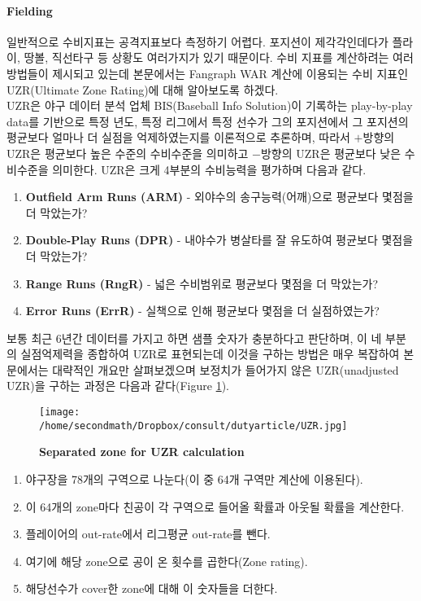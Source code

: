 \documentclass[11pt]{article}
\begin{document}
\paragraph{Fielding}
일반적으로 수비지표는 공격지표보다 측정하기 어렵다. 포지션이 제각각인데다가 플라이, 땅볼, 직선타구 등 상황도 여러가지가 있기 때문이다. 수비 지표를 계산하려는 여러 방법들이 제시되고 있는데 본문에서는 Fangraph WAR 계산에 이용되는 수비 지표인 UZR(Ultimate Zone Rating)에 대해 알아보도록 하겠다\cite{lichtman2003ultimate,piette2012estimating}.\\
UZR은 야구 데이터 분석 업체 BIS(Baseball Info Solution)이 기록하는 play-by-play data를 기반으로 특정 년도, 특정 리그에서 특정 선수가 그의 포지션에서 그 포지션의 평균보다 얼마나 더 실점을 억제하였는지를 이론적으로 추론하며, 따라서 $+$방향의 UZR은 평균보다 높은 수준의 수비수준을 의미하고 $-$방향의 UZR은 평균보다 낮은 수비수준을 의미한다. UZR은 크게 4부분의 수비능력을 평가하며 다음과 같다.
\begin{enumerate}
  \item \textbf{Outfield Arm Runs (ARM)} - 외야수의 송구능력(어깨)으로 평균보다 몇점을 더 막았는가?
  \item \textbf{Double-Play Runs (DPR)} - 내야수가 병살타를 잘 유도하여 평균보다 몇점을 더 막았는가?
  \item \textbf{Range Runs  (RngR)} - 넓은 수비범위로 평균보다 몇점을 더 막았는가?
  \item \textbf{Error Runs (ErrR)} - 실책으로 인해 평균보다 몇점을 더 실점하였는가?\\
\end{enumerate}

보통 최근 6년간 데이터를 가지고 하면 샘플 숫자가 충분하다고 판단하며, 이 네 부분의 실점억제력을 종합하여 UZR로 표현되는데 이것을 구하는 방법은 매우 복잡하여 본문에서는 대략적인 개요만 살펴보겠으며 보정치가 들어가지 않은 UZR(unadjusted UZR)을 구하는 과정은 다음과 같다\cite{UZRsaber}(Figure \ref{fig2}).

\begin{figure}[!hbp]
\centering
\texttt{[image: /home/secondmath/Dropbox/consult/dutyarticle/UZR.jpg]}
\caption{\bf {Separated zone for UZR calculation}}
\label{fig2}
\end{figure}



\begin{enumerate}
  \item 야구장을 78개의 구역으로 나눈다(이 중 64개 구역만 계산에 이용된다).
  \item 이 64개의 zone마다 친공이 각 구역으로 들어올 확률과 아웃될 확률을 계산한다.
  \item 플레이어의 out-rate에서 리그평균 out-rate를 뺀다.
  \item 여기에 해당 zone으로 공이 온 횟수를 곱한다(Zone rating).
  \item 해당선수가 cover한 zone에 대해 이 숫자들을 더한다. 
\end{enumerate}
\end{document}
